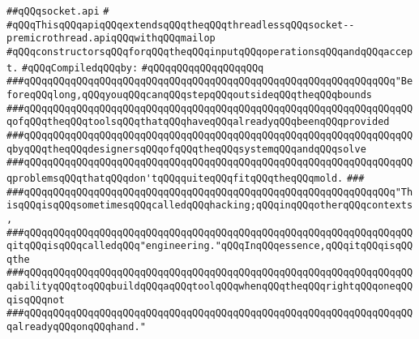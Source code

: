 \label{src/lib/std/src/socket/socket.api}
\verb|##qQQqsocket.api|\newline
\verb|#|\newline
\verb|#qQQqThisqQQqapiqQQqextendsqQQqtheqQQqthreadlessqQQqsocket--premicrothread.apiqQQqwithqQQqmailop|\newline
\verb|#qQQqconstructorsqQQqforqQQqtheqQQqinputqQQqoperationsqQQqandqQQqaccept.|\newline
\newline
\verb|#qQQqCompiledqQQqby:|\newline
\verb|#qQQqqQQqqQQqqQQqqQQq|\newline
\newline
\newline
\newline
\newline
\newline
\newline
\newline
\verb|###qQQqqQQqqQQqqQQqqQQqqQQqqQQqqQQqqQQqqQQqqQQqqQQqqQQqqQQqqQQqqQQq"BeforeqQQqlong,qQQqyouqQQqcanqQQqstepqQQqoutsideqQQqtheqQQqbounds|\newline
\verb|###qQQqqQQqqQQqqQQqqQQqqQQqqQQqqQQqqQQqqQQqqQQqqQQqqQQqqQQqqQQqqQQqqQQqofqQQqtheqQQqtoolsqQQqthatqQQqhaveqQQqalreadyqQQqbeenqQQqprovided|\newline
\verb|###qQQqqQQqqQQqqQQqqQQqqQQqqQQqqQQqqQQqqQQqqQQqqQQqqQQqqQQqqQQqqQQqqQQqbyqQQqtheqQQqdesignersqQQqofqQQqtheqQQqsystemqQQqandqQQqsolve|\newline
\verb|###qQQqqQQqqQQqqQQqqQQqqQQqqQQqqQQqqQQqqQQqqQQqqQQqqQQqqQQqqQQqqQQqqQQqproblemsqQQqthatqQQqdon'tqQQqquiteqQQqfitqQQqtheqQQqmold.|\newline
\verb|###|\newline
\verb|###qQQqqQQqqQQqqQQqqQQqqQQqqQQqqQQqqQQqqQQqqQQqqQQqqQQqqQQqqQQqqQQq"ThisqQQqisqQQqsometimesqQQqcalledqQQqhacking;qQQqinqQQqotherqQQqcontexts,|\newline
\verb|###qQQqqQQqqQQqqQQqqQQqqQQqqQQqqQQqqQQqqQQqqQQqqQQqqQQqqQQqqQQqqQQqqQQqitqQQqisqQQqcalledqQQq"engineering."qQQqInqQQqessence,qQQqitqQQqisqQQqthe|\newline
\verb|###qQQqqQQqqQQqqQQqqQQqqQQqqQQqqQQqqQQqqQQqqQQqqQQqqQQqqQQqqQQqqQQqqQQqabilityqQQqtoqQQqbuildqQQqaqQQqtoolqQQqwhenqQQqtheqQQqrightqQQqoneqQQqisqQQqnot|\newline
\verb|###qQQqqQQqqQQqqQQqqQQqqQQqqQQqqQQqqQQqqQQqqQQqqQQqqQQqqQQqqQQqqQQqqQQqalreadyqQQqonqQQqhand."|\newline

